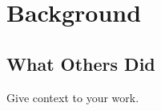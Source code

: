 \chapter{Background}
\label{chapter:background}

\section{What Others Did}

Give context to your work.